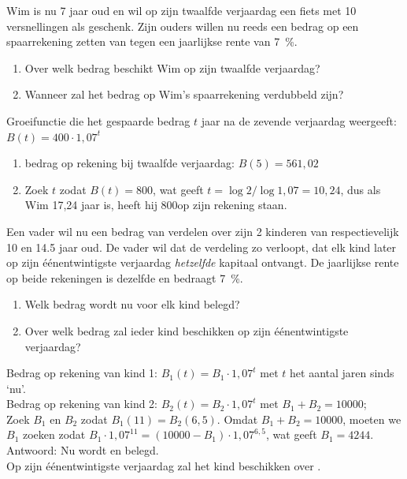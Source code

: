 \begin{oef}
Wim is nu 7 jaar oud en wil op zijn twaalfde
    verjaardag een
    fiets met 10 versnellingen als geschenk. Zijn ouders willen nu
    reeds een bedrag op een spaarrekening zetten van  tegen een
    jaarlijkse rente van \SI{7}{\percent}.
    \begin{enumerate}
        \item   Over welk bedrag beschikt Wim op zijn
    twaalfde verjaardag?

        \item  Wanneer zal het bedrag op Wim's spaarrekening verdubbeld
        zijn?

    \end{enumerate}
      \begin{opl}
  		Groeifunctie die het gespaarde bedrag $t$ jaar na de zevende verjaardag weergeeft: $B(t)=400\cdot 1,07^t$\\
  		\begin{enumerate}
  		\item bedrag op rekening bij twaalfde verjaardag: $B(5)=561,02$
  		\item Zoek $t$ zodat $B(t)=800$, wat geeft $t=\log2/\log1,07=10,24$, dus als Wim 17,24 jaar is, heeft hij 800\euros op zijn rekening staan.
  		\end{enumerate}
      \end{opl}

\end{oef}



\begin{oef}
  Een vader wil nu een bedrag van  verdelen over zijn
    2 kinderen van respectievelijk 10 en \num{14,5} jaar oud. De vader wil
    dat de verdeling zo verloopt, dat elk kind later op zijn
    \'{e}\'{e}nentwintigste verjaardag \emph{hetzelfde} kapitaal ontvangt.
    De jaarlijkse rente op beide rekeningen is dezelfde en bedraagt \SI{7}{\percent}.
    \begin{enumerate}
        \item   Welk bedrag wordt nu voor elk kind belegd?
        \item  Over welk bedrag zal ieder kind beschikken op zijn
        \'{e}\'{e}nentwintigste verjaardag?
    \end{enumerate}
\begin{opl}
Bedrag op rekening van kind 1: $B_1(t)=B_1\cdot 1,07^t$ met $t$ het aantal jaren sinds `nu'.\\
Bedrag op rekening van kind 2: $B_2(t)=B_2\cdot 1,07^t$ met $B_1+B_2=\num{10000}$; \\
Zoek $B_1$ en $B_2$ zodat $B_1(11)=B_2(6,5)$. Omdat $B_1+B_2=\num{10000}$, moeten we $B_1$ zoeken zodat 
$B_1\cdot 1,07^{11}=(10000-B_1)\cdot 1,07^{6,5}$, wat geeft $B_1=4244$. \\
Antwoord: Nu wordt  en  belegd.\\
Op zijn  \'{e}\'{e}nentwintigste verjaardag zal het kind beschikken over .
\end{opl}
\end{oef}




